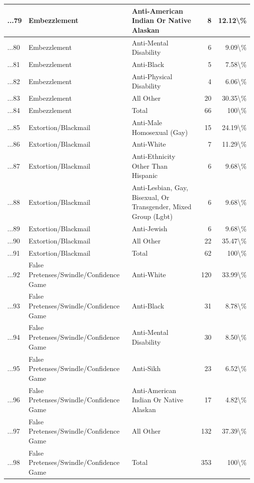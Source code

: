 \documentclass[
]{krantz}
\begin{document}
\begin{longtable}[t]{l|l|l|r|r}
\hline
...79 & Embezzlement & Anti-American Indian Or Native Alaskan & 8 & 12.12\textbackslash{}\%\\
\hline
...80 & Embezzlement & Anti-Mental Disability & 6 & 9.09\textbackslash{}\%\\
\hline
...81 & Embezzlement & Anti-Black & 5 & 7.58\textbackslash{}\%\\
\hline
...82 & Embezzlement & Anti-Physical Disability & 4 & 6.06\textbackslash{}\%\\
\hline
...83 & Embezzlement & All Other & 20 & 30.35\textbackslash{}\%\\
\hline
...84 & Embezzlement & Total & 66 & 100\textbackslash{}\%\\
\hline
...85 & Extortion/Blackmail & Anti-Male Homosexual (Gay) & 15 & 24.19\textbackslash{}\%\\
\hline
...86 & Extortion/Blackmail & Anti-White & 7 & 11.29\textbackslash{}\%\\
\hline
...87 & Extortion/Blackmail & Anti-Ethnicity Other Than Hispanic & 6 & 9.68\textbackslash{}\%\\
\hline
...88 & Extortion/Blackmail & Anti-Lesbian, Gay, Bisexual, Or Transgender, Mixed Group (Lgbt) & 6 & 9.68\textbackslash{}\%\\
\hline
...89 & Extortion/Blackmail & Anti-Jewish & 6 & 9.68\textbackslash{}\%\\
\hline
...90 & Extortion/Blackmail & All Other & 22 & 35.47\textbackslash{}\%\\
\hline
...91 & Extortion/Blackmail & Total & 62 & 100\textbackslash{}\%\\
\hline
...92 & False Pretenses/Swindle/Confidence Game & Anti-White & 120 & 33.99\textbackslash{}\%\\
\hline
...93 & False Pretenses/Swindle/Confidence Game & Anti-Black & 31 & 8.78\textbackslash{}\%\\
\hline
...94 & False Pretenses/Swindle/Confidence Game & Anti-Mental Disability & 30 & 8.50\textbackslash{}\%\\
\hline
...95 & False Pretenses/Swindle/Confidence Game & Anti-Sikh & 23 & 6.52\textbackslash{}\%\\
\hline
...96 & False Pretenses/Swindle/Confidence Game & Anti-American Indian Or Native Alaskan & 17 & 4.82\textbackslash{}\%\\
\hline
...97 & False Pretenses/Swindle/Confidence Game & All Other & 132 & 37.39\textbackslash{}\%\\
\hline
...98 & False Pretenses/Swindle/Confidence Game & Total & 353 & 100\textbackslash{}\%\\

\end{longtable}
\end{document}

